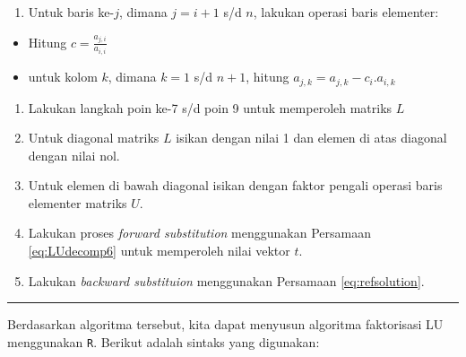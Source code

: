 \documentclass[]{book}
\providecommand{\tightlist}{%
  \setlength{\itemsep}{0pt}\setlength{\parskip}{0pt}}
\theoremstyle{definition}
\theoremstyle{definition}
\theoremstyle{definition}
\theoremstyle{remark}
\begin{document}
\begin{enumerate}
\def\labelenumi{\arabic{enumi}.}
\setcounter{enumi}{4}
\tightlist
\item
  Untuk baris ke-\(j\), dimana \(j=i+1\) s/d \(n\), lakukan operasi baris elementer:
\end{enumerate}

\begin{itemize}
\tightlist
\item
  Hitung \(c=\frac{a_{j,i}}{a_{i,i}}\)
\item
  untuk kolom \(k\), dimana \(k=1\) s/d \(n+1\), hitung \(a_{j,k}=a_{j,k}-c_i.a_{i,k}\)
\end{itemize}

\begin{enumerate}
\def\labelenumi{\arabic{enumi}.}
\setcounter{enumi}{5}
\tightlist
\item
  Lakukan langkah poin ke-7 s/d poin 9 untuk memperoleh matriks \(L\)
\item
  Untuk diagonal matriks \(L\) isikan dengan nilai 1 dan elemen di atas diagonal dengan nilai nol.
\item
  Untuk elemen di bawah diagonal isikan dengan faktor pengali operasi baris elementer matriks \(U\).
\item
  Lakukan proses \emph{forward substitution} menggunakan Persamaan \eqref{eq:LUdecomp6} untuk memperoleh nilai vektor \(t\).
\item
  Lakukan \emph{backward substituion} menggunakan Persamaan \eqref{eq:refsolution}.
\end{enumerate}

\begin{center}\rule{0.5\linewidth}{\linethickness}\end{center}

Berdasarkan algoritma tersebut, kita dapat menyusun algoritma faktorisasi LU menggunakan \texttt{R}. Berikut adalah sintaks yang digunakan:
\end{document}
